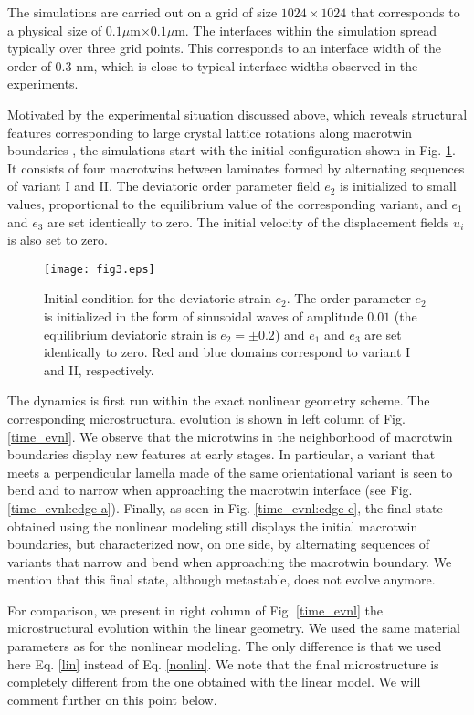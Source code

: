 \documentclass[twocolumn,amsmath,amssymb]{revtex4}
\begin{document}
The simulations are carried out on a grid of size $1024\times1024$ that corresponds to a physical size of $0.1\mu$m$\times0.1\mu$m. The interfaces within the simulation spread typically over three grid points. This corresponds to an interface width of the order of  $0.3$ nm, which is close to typical interface widths observed in the experiments.           

Motivated by the experimental situation discussed above, which reveals structural features corresponding to large crystal lattice rotations along macrotwin boundaries \cite{Boullay:2001rw}, the simulations start with the initial configuration shown in Fig. \ref{initial_configuration}. It consists of four macrotwins between laminates formed by alternating sequences of variant I and II. The deviatoric order parameter field $e_2$ is initialized to small values, proportional to the equilibrium value of the corresponding variant, and $e_1$ and $e_3$ are set identically to zero. The initial velocity of the displacement fields $u_i$ is also set to zero.
%
%
\begin{figure}[htbp]
\begin{center}
\texttt{[image: fig3.eps]}
\end{center}
\caption{\label{initial_configuration}Initial condition for the deviatoric strain $e_2$. The order parameter $e_2$ is initialized in the form of sinusoidal waves of amplitude $0.01$ (the equilibrium deviatoric strain is $e_2 = \pm 0.2$) and $e_1$ and $e_3$ are set identically to zero. Red and blue domains correspond to variant I and II, respectively.}
\end{figure} 
%
The dynamics is first run within the exact nonlinear geometry scheme. The corresponding microstructural evolution is shown in left column of Fig. \ref{time_evnl}. We observe that the microtwins in the neighborhood of macrotwin boundaries display new features at early stages. In particular, a variant that meets a perpendicular lamella made of the same orientational variant is seen to bend and to narrow when approaching the macrotwin interface (see Fig. \ref{time_evnl:edge-a}). Finally, as seen in Fig. \ref{time_evnl:edge-c}, the final state obtained using the nonlinear modeling still displays the initial macrotwin boundaries, but characterized now, on one side, by alternating sequences of variants that narrow and bend when approaching the macrotwin boundary. We mention that this final state, although metastable, does not evolve anymore.

For comparison, we present in right column of  Fig. \ref{time_evnl} the microstructural evolution within the linear geometry. We used the same material parameters as for the nonlinear modeling. The only difference is that we used here Eq. \ref{lin} instead of Eq. \ref{nonlin}. We note that the final microstructure is completely different from the one obtained with the linear model. We will comment further on this point below.
\end{document}
